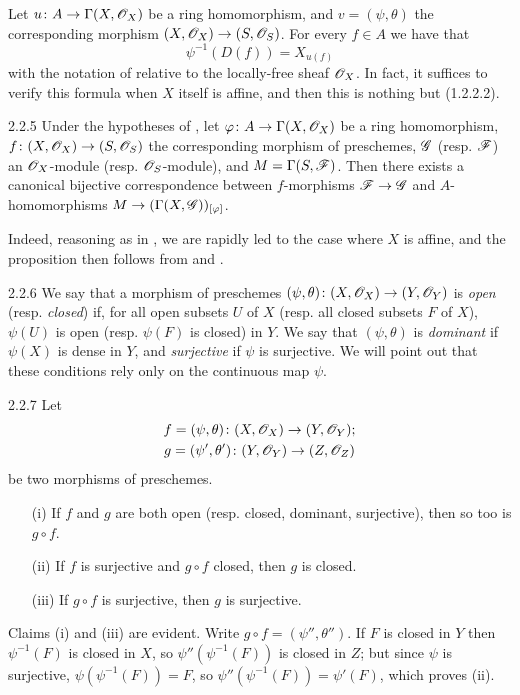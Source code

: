 \documentclass{book}
\begin{document}
Let $u\colon A\to\Gamma(X,\mathscr{O}_X)$ be a ring homomorphism, and $v=(\psi,\theta)$
the corresponding morphism $(X,\mathscr{O}_X)\to(S,\mathscr{O}_S)$. For every $f\in A$ we have
that
\[
  \psi^{-1}(D(f))=X_{u(f)}\tag{2.2.4.1}
\]
with the notation of  relative to the locally-free sheaf
$\mathscr{O}_X$. In fact, it suffices to verify this formula when $X$ itself is affine,
and then this is nothing but (1.2.2.2).

\begin{envs}[Proposition]{2.2.5}
\label{prop-1.2.2.5}
Under the hypotheses of , let
$\varphi\colon A\to\Gamma(X,\mathscr{O}_X)$ be a ring homomorphism,
$f\colon(X,\mathscr{O}_X)\to(S,\mathscr{O}_S)$ the corresponding morphism of preschemes,
$\mathscr{G}$ (resp. $\mathscr{F}$) an $\mathscr{O}_X$-module (resp. $\mathscr{O}_S$-module), and
$M=\Gamma(S,\mathscr{F})$. Then there exists a canonical bijective
correspondence between $f$-morphisms $\mathscr{F}\to\mathscr{G}$
 and $A$-homomorphisms $M\to(\Gamma(X,\mathscr{G}))_{[\varphi]}$.
\end{envs}

Indeed, reasoning as in
, we are rapidly led to the case where $X$ is affine, and the proposition
then follows from  and .

\begin{env}{2.2.6}
\label{env-1.2.2.6}
We say that a morphism of preschemes
$(\psi,\theta)\colon(X,\mathscr{O}_X)\to(Y,\mathscr{O}_Y)$ is \emph{open} (resp. \emph{closed})
if, for all open subsets $U$ of $X$ (resp. all closed subsets $F$ of $X$),
$\psi(U)$ is open (resp. $\psi(F)$ is closed) in $Y$. We say that
$(\psi,\theta)$ is \emph{dominant} if $\psi(X)$ is dense in $Y$, and
\emph{surjective} if $\psi$ is surjective. We will point out that these
conditions rely only on the continuous map $\psi$.
\end{env}

\begin{envs}[Proposition]{2.2.7}
\label{prop-1.2.2.7}
Let
\begin{gather*}
  f=(\psi,\theta)\colon(X,\mathscr{O}_X)\to(Y,\mathscr{O}_Y);\\
  g=(\psi',\theta')\colon(Y,\mathscr{O}_Y)\to(Z,\mathscr{O}_Z)
\end{gather*}
be two morphisms of
preschemes.
\begin{itemize}
  \item[(i)] If $f$ and $g$ are both open (resp. closed, dominant, surjective),
             then so too is $g\circ f$.
  \item[(ii)] If $f$ is surjective and $g\circ f$ closed, then $g$ is closed.
  \item[(iii)] If $g\circ f$ is surjective, then $g$ is surjective.
\end{itemize}
\end{envs}
Claims (i) and (iii) are evident. Write $g\circ f=(\psi'',\theta'')$.
If $F$ is closed in $Y$ then $\psi^{-1}(F)$ is closed in $X$, so
$\psi''(\psi^{-1}(F))$ is closed in $Z$; but since $\psi$ is surjective,
$\psi(\psi^{-1}(F))=F$, so $\psi''(\psi^{-1}(F))=\psi'(F)$, which proves (ii).
\end{document}
